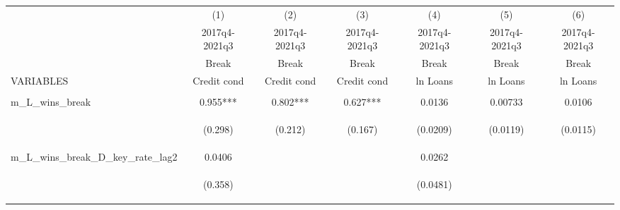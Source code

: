 



\begin{tabular}{lcccccc} \hline
 & (1) & (2) & (3) & (4) & (5) & (6) \\
 & 2017q4-2021q3 & 2017q4-2021q3 & 2017q4-2021q3 & 2017q4-2021q3 & 2017q4-2021q3 & 2017q4-2021q3 \\
 & Break & Break & Break & Break & Break & Break \\
VARIABLES & Credit cond & Credit cond & Credit cond & ln Loans & ln Loans & ln Loans \\ \hline
\vspace{4pt} & \begin{footnotesize}\end{footnotesize} & \begin{footnotesize}\end{footnotesize} & \begin{footnotesize}\end{footnotesize} & \begin{footnotesize}\end{footnotesize} & \begin{footnotesize}\end{footnotesize} & \begin{footnotesize}\end{footnotesize} \\
m\_L\_wins\_break & 0.955*** & 0.802*** & 0.627*** & 0.0136 & 0.00733 & 0.0106 \\
\vspace{4pt} & \begin{footnotesize}(0.298)\end{footnotesize} & \begin{footnotesize}(0.212)\end{footnotesize} & \begin{footnotesize}(0.167)\end{footnotesize} & \begin{footnotesize}(0.0209)\end{footnotesize} & \begin{footnotesize}(0.0119)\end{footnotesize} & \begin{footnotesize}(0.0115)\end{footnotesize} \\
m\_L\_wins\_break\_D\_key\_rate\_lag2 & 0.0406 &  &  & 0.0262 &  &  \\
\vspace{4pt} & \begin{footnotesize}(0.358)\end{footnotesize} & \begin{footnotesize}\end{footnotesize} & \begin{footnotesize}\end{footnotesize} & \begin{footnotesize}(0.0481)\end{footnotesize} & \begin{footnotesize}\end{footnotesize} & \begin{footnotesize}\end{footnotesize} \\

\end{tabular}
